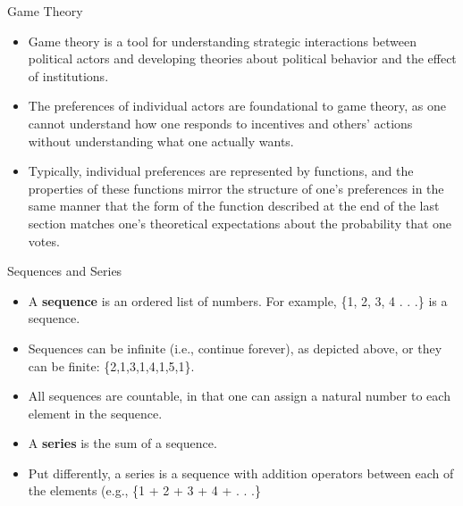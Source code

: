 \documentclass[
  ignorenonframetext,
]{beamer}
\begin{document}
\begin{frame}{Game Theory}
\protect\hypertarget{game-theory}{}

\begin{itemize}
\item
  Game theory is a tool for understanding strategic interactions between
  political actors and developing theories about political behavior and
  the effect of institutions.
\item
  The preferences of individual actors are foundational to game theory,
  as one cannot understand how one responds to incentives and others'
  actions without understanding what one actually wants.
\item
  Typically, individual preferences are represented by functions, and
  the properties of these functions mirror the structure of one's
  preferences in the same manner that the form of the function described
  at the end of the last section matches one's theoretical expectations
  about the probability that one votes.
\end{itemize}

\end{frame}

\begin{frame}{Sequences and Series}
\protect\hypertarget{sequences-and-series}{}

\begin{itemize}
\item
  A \textbf{sequence} is an ordered list of numbers. For example, \{1,
  2, 3, 4 . . .\} is a sequence.
\item
  Sequences can be infinite (i.e., continue forever), as depicted above,
  or they can be finite: \{2,1,3,1,4,1,5,1\}.
\item
  All sequences are countable, in that one can assign a natural number
  to each element in the sequence.
\item
  A \textbf{series} is the sum of a sequence.
\item
  Put differently, a series is a sequence with addition operators
  between each of the elements (e.g., \{1 + 2 + 3 + 4 + . . .\}
\end{itemize}

\end{frame}
\end{document}
